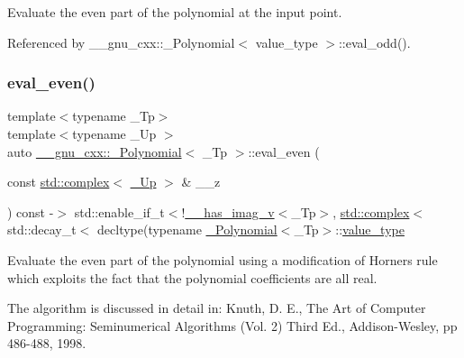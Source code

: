 Evaluate the even part of the polynomial at the input point. 

Referenced by \+\_\+\+\_\+gnu\+\_\+cxx\+::\+\_\+\+Polynomial$<$ value\+\_\+type $>$\+::eval\+\_\+odd().

\mbox{\label{class____gnu__cxx_1_1__Polynomial_a7314653c50b311781a26ac74789d84a1}} 
\subsubsection{\texorpdfstring{eval\+\_\+even()}{eval\_even()}\hspace{0.1cm}{\footnotesize\ttfamily [3/3]}}
{\footnotesize\ttfamily template$<$typename \+\_\+\+Tp$>$ \\
template$<$typename \+\_\+\+Up $>$ \\
auto \hyperlink{class____gnu__cxx_1_1__Polynomial}{\+\_\+\+\_\+gnu\+\_\+cxx\+::\+\_\+\+Polynomial}$<$ \+\_\+\+Tp $>$\+::eval\+\_\+even (\begin{DoxyParamCaption}\item[{const \hyperlink{classstd_1_1complex}{std\+::complex}$<$ \hyperlink{class____gnu__cxx_1_1__Polynomial_a242114d4b86648a5dff67a8221f80d40}{\+\_\+\+Up} $>$ \&}]{\+\_\+\+\_\+z }\end{DoxyParamCaption}) const -\/$>$ std\+::enable\+\_\+if\+\_\+t$<$!\hyperlink{namespace____gnu__cxx_afa2404a914b06f950f3a46e75aca51a9}{\+\_\+\+\_\+has\+\_\+imag\+\_\+v}$<$\+\_\+\+Tp$>$,
			\hyperlink{classstd_1_1complex}{std\+::complex}$<$std\+::decay\+\_\+t$<$
		decltype(typename \hyperlink{class____gnu__cxx_1_1__Polynomial}{\+\_\+\+Polynomial}$<$\+\_\+\+Tp$>$\+::\hyperlink{class____gnu__cxx_1_1__Polynomial_a725563351f50e76084a7a016c06f8a53}{value\+\_\+type}\hspace{0.3cm}{\ttfamily [inline]}}

Evaluate the even part of the polynomial using a modification of Horner\textquotesingle{}s rule which exploits the fact that the polynomial coefficients are all real.

The algorithm is discussed in detail in\+: Knuth, D. E., The Art of Computer Programming\+: Seminumerical Algorithms (Vol. 2) Third Ed., Addison-\/\+Wesley, pp 486-\/488, 1998.

